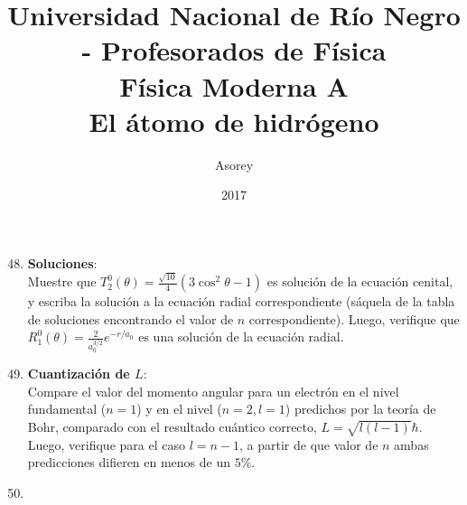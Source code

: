 \documentclass[a4paper,12pt]{article}
\begin{document}
\title{
{\normalsize{Universidad Nacional de Río Negro - Profesorados de Física}}\\
Física Moderna A \\ El átomo de hidrógeno\\}
\author{Asorey}
\date{2017}
\maketitle

\begin{enumerate}
	\setcounter{enumi}{47}      %
	\item {\bf{Soluciones}}:\\
		Muestre que $T_2^0(\theta) = \frac{\sqrt{10}}{4} (3 \cos^2 \theta - 1)$
		es solución de la ecuación cenital, y escriba la solución a la ecuación
		radial correspondiente (sáquela de la tabla de soluciones encontrando
		el valor de $n$ correspondiente). Luego, verifique que $R_1^0(\theta) =
		\frac{2}{a_0^{3/2}} e^{-r/a_0}$ es una solución de la ecuación radial.

	\item {\bf{Cuantización de $L$}}:\\
		Compare el valor del momento angular para un electrón en el nivel
		fundamental ($n=1$) y en el nivel ($n=2, l=1$) predichos por la teoría
		de Bohr, comparado con el resultado cuántico correcto, $L=\sqrt{l(l-1)}
		\hbar$. Luego, verifique para el caso $l=n-1$, a partir de que valor de
		$n$ ambas predicciones difieren en menos de un $5\%$. 

	\item 

\end{enumerate}
\end{document}
